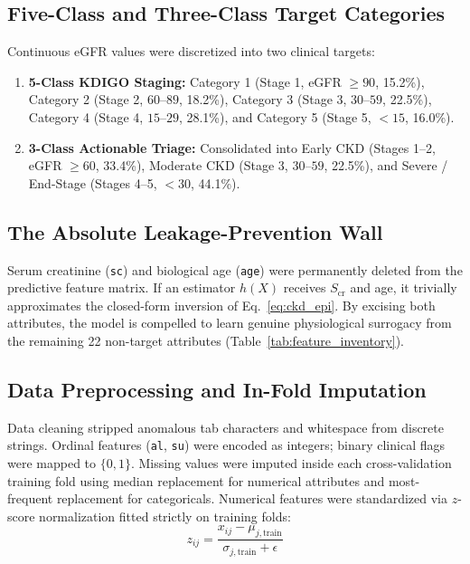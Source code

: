 \documentclass[10pt,conference]{IEEEtran}
\begin{document}
\subsection{Five-Class and Three-Class Target Categories}
Continuous eGFR values were discretized into two clinical targets:
\begin{enumerate}
    \item \textbf{5-Class KDIGO Staging:} Category 1 (Stage 1, eGFR $\ge 90$, 15.2\%), Category 2 (Stage 2, $60$--$89$, 18.2\%), Category 3 (Stage 3, $30$--$59$, 22.5\%), Category 4 (Stage 4, $15$--$29$, 28.1\%), and Category 5 (Stage 5, $< 15$, 16.0\%).
    \item \textbf{3-Class Actionable Triage:} Consolidated into Early CKD (Stages 1--2, eGFR $\ge 60$, 33.4\%), Moderate CKD (Stage 3, $30$--$59$, 22.5\%), and Severe / End-Stage (Stages 4--5, $< 30$, 44.1\%).
\end{enumerate}

\subsection{The Absolute Leakage-Prevention Wall}
Serum creatinine (\texttt{sc}) and biological age (\texttt{age}) were permanently deleted from the predictive feature matrix. If an estimator $h(X)$ receives $S_{\text{cr}}$ and age, it trivially approximates the closed-form inversion of Eq.~\eqref{eq:ckd_epi}. By excising both attributes, the model is compelled to learn genuine physiological surrogacy from the remaining 22 non-target attributes (Table~\ref{tab:feature_inventory}).

\subsection{Data Preprocessing and In-Fold Imputation}
Data cleaning stripped anomalous tab characters and whitespace from discrete strings. Ordinal features (\texttt{al}, \texttt{su}) were encoded as integers; binary clinical flags were mapped to $\{0, 1\}$. Missing values were imputed inside each cross-validation training fold using median replacement for numerical attributes and most-frequent replacement for categoricals. Numerical features were standardized via $z$-score normalization fitted strictly on training folds:
\begin{equation}
z_{ij} = \frac{x_{ij} - \mu_{j,\text{train}}}{\sigma_{j,\text{train}} + \epsilon}
\end{equation}
\end{document}
